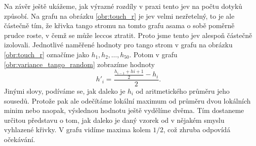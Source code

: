 
Na závěr ještě ukážeme, jak výrazné rozdíly v praxi tento jev na počtu dotyků
způsobí. Na grafu na obrázku \ref{obr:touch_r} je jev velmi nezřetelný, to je ale
částečně tím, že křivka tango stromu na tomto grafu asama o sobě poměrně prudce
roste, v čemž se může leccos ztratit. Proto jsme tento jev alespoň částečně
izolovali. Jednotlivé naměřené hodnoty pro tango strom v grafu na obrázku
\ref{obr:touch_r} označíme jako $h_1, h_2, \dots, h_{50}$. Potom v grafu
\ref{obr:variance_tango_random} zobrazíme hodnoty $$h'_i =
\frac{\frac{h_{i-1}+h{i+1}}2-h_i}2.$$ Jinými slovy, podíváme se, jak daleko je
$h_i$ od aritmetického průměru jeho sousedů. Protože pak ale odečítáme lokální
maximum od průměru dvou lokálních minim nebo naopak, výslednou hodnotu ještě
vydělíme dvěma. Tím dostaneme určitou představu o tom, jak daleko je daný
vzorek od v nějakém smyslu vyhlazené křivky. V grafu vidíme maxima kolem $1/2$,
což zhruba odpovídá očekávání. 

